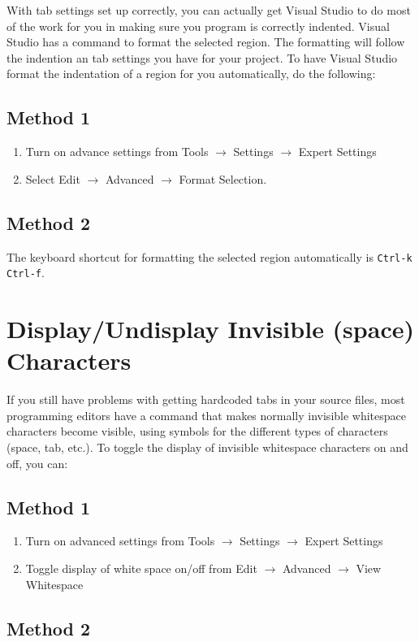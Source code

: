 \documentclass[11pt]{article}
\begin{document}
With tab settings set up correctly, you can actually get Visual Studio
to do most of the work for you in making sure you program is correctly
indented.  Visual Studio has a command to format the selected region.
The formatting will follow the indention an tab settings you have for
your project.  To have Visual Studio format the indentation of a region
for you automatically, do the following:
\subsection{Method 1}
\label{sec-3-1}

\begin{enumerate}
\item Turn on advance settings from Tools $\rightarrow$ Settings
   $\rightarrow$ Expert Settings
\item Select Edit $\rightarrow$ Advanced $\rightarrow$ Format Selection.
\end{enumerate}
\subsection{Method 2}
\label{sec-3-2}

The keyboard shortcut for formatting the selected region automatically is
\verb~Ctrl-k~ \verb~Ctrl-f~.
\section{Display/Undisplay Invisible (space) Characters}
\label{sec-4}

If you still have problems with getting hardcoded tabs in your source
files, most programming editors have a command that makes normally
invisible whitespace characters become visible, using symbols for the
different types of characters (space, tab, etc.).  To toggle the
display of invisible whitespace characters on and off, you can:
\subsection{Method 1}
\label{sec-4-1}

\begin{enumerate}
\item Turn on advanced settings from Tools $\rightarrow$ Settings $\rightarrow$ Expert Settings
\item Toggle display of white space on/off from Edit $\rightarrow$ Advanced $\rightarrow$ View Whitespace
\end{enumerate}
\subsection{Method 2}
\label{sec-4-2}
\end{document}
